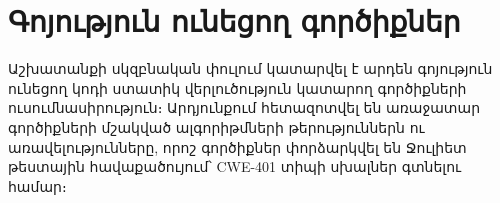 {
    \clearpage
    \section{Գոյություն ունեցող գործիքներ}\label{sec:existingTools}
    Աշխատանքի սկզբնական փուլում կատարվել է արդեն գոյություն ունեցող կոդի ստատիկ վերլուծություն կատարող գործիքների
    ուսումնասիրություն։ Արդյունքում հետազոտվել են առաջատար գործիքների մշակված ալգորիթմների թերություններն ու
    առավելությունները, որոշ գործիքներ փորձարկվել են Ջուլիետ թեստային հավաքածույում՝ CWE-401 տիպի սխալներ\cite{CWE401}
    գտնելու համար։

    

    

    

    

    

    

    

    
}